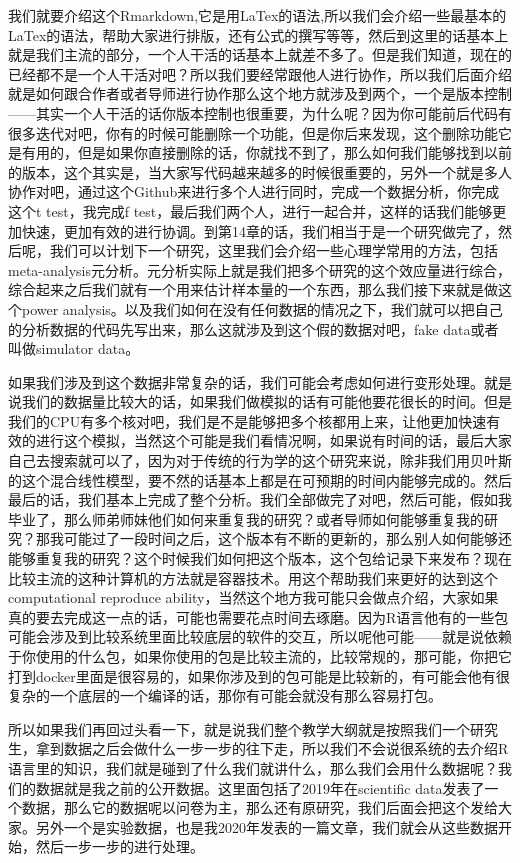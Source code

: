 \documentclass[
  oneside]{book}
\begin{document}
我们就要介绍这个Rmarkdown,它是用LaTex的语法,所以我们会介绍一些最基本的LaTex的语法，帮助大家进行排版，还有公式的撰写等等，然后到这里的话基本上就是我们主流的部分，一个人干活的话基本上就差不多了。但是我们知道，现在的已经都不是一个人干活对吧？所以我们要经常跟他人进行协作，所以我们后面介绍就是如何跟合作者或者导师进行协作那么这个地方就涉及到两个，一个是版本控制------其实一个人干活的话你版本控制也很重要，为什么呢？因为你可能前后代码有很多迭代对吧，你有的时候可能删除一个功能，但是你后来发现，这个删除功能它是有用的，但是如果你直接删除的话，你就找不到了，那么如何我们能够找到以前的版本，这个其实是，当大家写代码越来越多的时候很重要的，另外一个就是多人协作对吧，通过这个Github来进行多个人进行同时，完成一个数据分析，你完成这个t test，我完成f test，最后我们两个人，进行一起合并，这样的话我们能够更加快速，更加有效的进行协调。到第14章的话，我们相当于是一个研究做完了，然后呢，我们可以计划下一个研究，这里我们会介绍一些心理学常用的方法，包括meta-analysis元分析。元分析实际上就是我们把多个研究的这个效应量进行综合，综合起来之后我们就有一个用来估计样本量的一个东西，那么我们接下来就是做这个power analysis。以及我们如何在没有任何数据的情况之下，我们就可以把自己的分析数据的代码先写出来，那么这就涉及到这个假的数据对吧，fake data或者叫做simulator data。

如果我们涉及到这个数据非常复杂的话，我们可能会考虑如何进行变形处理。就是说我们的数据量比较大的话，如果我们做模拟的话有可能他要花很长的时间。但是我们的CPU有多个核对吧，我们是不是能够把多个核都用上来，让他更加快速有效的进行这个模拟，当然这个可能是我们看情况啊，如果说有时间的话，最后大家自己去搜索就可以了，因为对于传统的行为学的这个研究来说，除非我们用贝叶斯的这个混合线性模型，要不然的话基本上都是在可预期的时间内能够完成的。然后最后的话，我们基本上完成了整个分析。我们全部做完了对吧，然后可能，假如我毕业了，那么师弟师妹他们如何来重复我的研究？或者导师如何能够重复我的研究？那我可能过了一段时间之后，这个版本有不断的更新的，那么别人如何能够还能够重复我的研究？这个时候我们如何把这个版本，这个包给记录下来发布？现在比较主流的这种计算机的方法就是容器技术。用这个帮助我们来更好的达到这个computational reproduce ability，当然这个地方我可能只会做点介绍，大家如果真的要去完成这一点的话，可能也需要花点时间去琢磨。因为R语言他有的一些包可能会涉及到比较系统里面比较底层的软件的交互，所以呢他可能------就是说依赖于你使用的什么包，如果你使用的包是比较主流的，比较常规的，那可能，你把它打到docker里面是很容易的，如果你涉及到的包可能是比较新的，有可能会他有很复杂的一个底层的一个编译的话，那你有可能会就没有那么容易打包。

所以如果我们再回过头看一下，就是说我们整个教学大纲就是按照我们一个研究生，拿到数据之后会做什么一步一步的往下走，所以我们不会说很系统的去介绍R语言里的知识，我们就是碰到了什么我们就讲什么，那么我们会用什么数据呢？我们的数据就是我之前的公开数据。这里面包括了2019年在scientific data发表了一个数据，那么它的数据呢以问卷为主，那么还有原研究，我们后面会把这个发给大家。另外一个是实验数据，也是我2020年发表的一篇文章，我们就会从这些数据开始，然后一步一步的进行处理。
\end{document}
